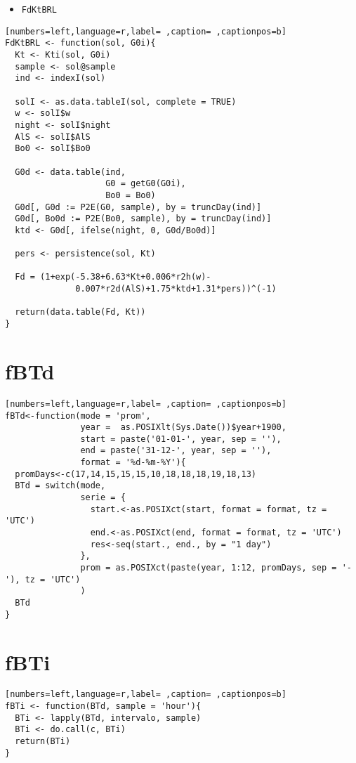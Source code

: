 \begin{itemize}
\item \texttt{FdKtBRL}
\end{itemize}
\begin{lstlisting}[numbers=left,language=r,label= ,caption= ,captionpos=b]
FdKtBRL <- function(sol, G0i){
  Kt <- Kti(sol, G0i)
  sample <- sol@sample
  ind <- indexI(sol)
  
  solI <- as.data.tableI(sol, complete = TRUE)
  w <- solI$w
  night <- solI$night
  AlS <- solI$AlS
  Bo0 <- solI$Bo0

  G0d <- data.table(ind,
                    G0 = getG0(G0i),
                    Bo0 = Bo0)
  G0d[, G0d := P2E(G0, sample), by = truncDay(ind)]
  G0d[, Bo0d := P2E(Bo0, sample), by = truncDay(ind)]
  ktd <- G0d[, ifelse(night, 0, G0d/Bo0d)]
  
  pers <- persistence(sol, Kt)

  Fd = (1+exp(-5.38+6.63*Kt+0.006*r2h(w)-
              0.007*r2d(AlS)+1.75*ktd+1.31*pers))^(-1)
  
  return(data.table(Fd, Kt))
}
\end{lstlisting}
\section{fBTd}
\label{sec:org652504c}
\begin{lstlisting}[numbers=left,language=r,label= ,caption= ,captionpos=b]
fBTd<-function(mode = 'prom',
               year =  as.POSIXlt(Sys.Date())$year+1900,
               start = paste('01-01-', year, sep = ''),
               end = paste('31-12-', year, sep = ''), 
               format = '%d-%m-%Y'){
  promDays<-c(17,14,15,15,15,10,18,18,18,19,18,13)
  BTd = switch(mode,
               serie = {
                 start.<-as.POSIXct(start, format = format, tz = 'UTC')
                 end.<-as.POSIXct(end, format = format, tz = 'UTC')
                 res<-seq(start., end., by = "1 day")
               },
               prom = as.POSIXct(paste(year, 1:12, promDays, sep = '-'), tz = 'UTC')
               )
  BTd
}
\end{lstlisting}
\section{fBTi}
\label{sec:org6772069}
\begin{lstlisting}[numbers=left,language=r,label= ,caption= ,captionpos=b]
fBTi <- function(BTd, sample = 'hour'){
  BTi <- lapply(BTd, intervalo, sample)
  BTi <- do.call(c, BTi)
  return(BTi)
}
\end{lstlisting}
